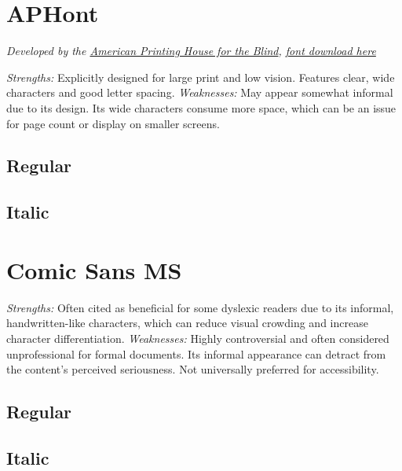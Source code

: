 \begin{raggedright}
\pagebreak
\section{APHont}\label{trouble7}
\emph{Developed by the \href{https://www.aph.org/resources/large-print-guidelines/}{American Printing House for the Blind}, \href{https://www.aph.org/resources/large-print-guidelines/}{font download here}}
\begin{raggedright}
\emph{Strengths:} Explicitly designed for large print and low vision. Features clear, wide characters and good letter spacing.
\emph{Weaknesses:} May appear somewhat informal due to its design. Its wide characters consume more space, which can be an issue for page count or display on smaller screens.

\subsection{Regular}
\FontSample{\aphontfont}

\subsection{Italic}
\FontSample{{\aphontfont\itshape}}
\end{raggedright}


\pagebreak
\section{Comic Sans MS}\label{trouble9}
\begin{raggedright}
\emph{Strengths:} Often cited as beneficial for some dyslexic readers due to its informal, handwritten-like characters, which can reduce visual crowding and increase character differentiation.
\emph{Weaknesses:} Highly controversial and often considered unprofessional for formal documents. Its informal appearance can detract from the content's perceived seriousness. Not universally preferred for accessibility.

\subsection{Regular}
\FontSample{\comicsansfont}

\subsection{Italic}
\FontSample{{\comicsansfont\itshape}}
\end{raggedright}



\end{raggedright}
